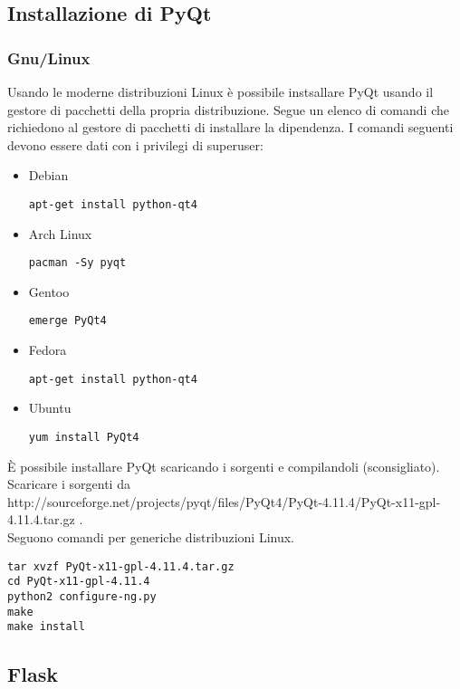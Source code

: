 \documentclass[12pt]{scrartcl}
\begin{document}
    \subsection{Installazione di PyQt}
        \subsubsection{Gnu/Linux}
        Usando le moderne distribuzioni Linux \`e possibile instsallare PyQt usando
        il gestore di pacchetti della propria distribuzione. Segue un elenco di 
        comandi che richiedono al gestore di pacchetti di installare la dipendenza.
        I comandi seguenti devono essere dati con i privilegi di superuser:\\
        \begin{itemize}
            \item Debian
            \begin{verbatim}
apt-get install python-qt4
            \end{verbatim}
            \item Arch Linux
            \begin{verbatim}
pacman -Sy pyqt
            \end{verbatim}
            \item Gentoo
            \begin{verbatim}
emerge PyQt4
            \end{verbatim}
            \item Fedora
            \begin{verbatim}
apt-get install python-qt4
            \end{verbatim}
            \item Ubuntu
             \begin{verbatim}
yum install PyQt4
            \end{verbatim}
        \end{itemize}
        \`E possibile installare PyQt scaricando i sorgenti e compilandoli (sconsigliato).
        Scaricare i sorgenti da
        \\http://sourceforge.net/projects/pyqt/files/PyQt4/PyQt-4.11.4/PyQt-x11-gpl-4.11.4.tar.gz .
        \\Seguono comandi per generiche distribuzioni Linux.
        \begin{verbatim}
tar xvzf PyQt-x11-gpl-4.11.4.tar.gz
cd PyQt-x11-gpl-4.11.4
python2 configure-ng.py
make
make install
        \end{verbatim}
    \subsection{Flask}
\end{document}
